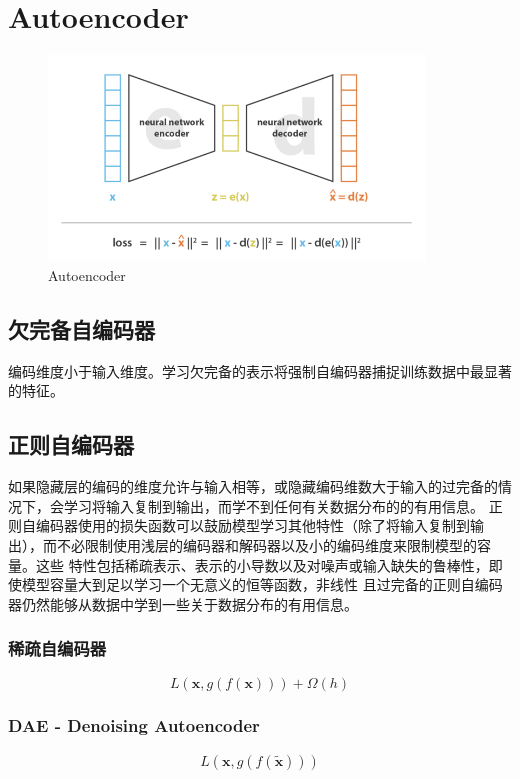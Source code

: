\chapter{Autoencoder}

\begin{figure}[H]
    \centering
    \includegraphics[width=10cm]{images/ae.png}
    \caption{Autoencoder}
    \label{fig:autoencoder}
\end{figure}

\section{欠完备自编码器}
编码维度小于输入维度。学习欠完备的表示将强制自编码器捕捉训练数据中最显著的特征。

\section{正则自编码器}
如果隐藏层的编码的维度允许与输入相等，或隐藏编码维数大于输入的过完备的情况下，会学习将输入复制到输出，而学不到任何有关数据分布的的有用信息。
正则自编码器使用的损失函数可以鼓励模型学习其他特性（除了将输入复制到输出），而不必限制使用浅层的编码器和解码器以及小的编码维度来限制模型的容量。这些
特性包括稀疏表示、表示的小导数以及对噪声或输入缺失的鲁棒性，即使模型容量大到足以学习一个无意义的恒等函数，非线性
且过完备的正则自编码器仍然能够从数据中学到一些关于数据分布的有用信息。

\subsection{稀疏自编码器}
\begin{equation}
    L(\mathbf{x}, g(f(\mathbf{x}))) + \Omega (h)
\end{equation}
\subsection{DAE - Denoising Autoencoder}
\begin{equation}
    L(\mathbf{x}, g(f(\tilde{\mathbf{x}})))
\end{equation}
